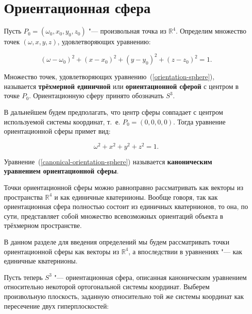 \section{Ориентационная сфера}

Пусть $P_0=(\omega_0,x_0,y_0,z_0)$ "--- произвольная точка из $\mathbb{R}^4$. Определим множество точек $(\omega,x,y,z)$,
удовлетворяющих уравнению:

\begin{equation}
(\omega-\omega_0)^2+(x-x_0)^2+(y-y_0)^2+(z-z_0)^2=1.
\label{orientation-sphere}
\end{equation}

\begin{definition}
Множество точек, удовлетворяющих уравнению~(\ref{orientation-sphere}), называется \textbf{трёхмерной единичной} или
\textbf{ориентационной сферой} с центром в точке $P_0$. Ориентационную сферу принято обозначать $S^3$.
\end{definition}

В дальнейшем будем предполагать, что центр сферы совпадает с центром используемой системы координат, т.~е. $P_0=(0,0,
0,0)$. Тогда уравнение ориентационной сферы примет вид:

\begin{equation}
\omega^2+x^2+y^2+z^2=1.
\label{canonical-orientation-sphere}
\end{equation}

\begin{definition}
Уравнение~(\ref{canonical-orientation-sphere}) называется \textbf{каноническим уравнением ориентационной сферы}.
\end{definition}

Точки ориентационной сферы можно равноправно рассматривать как векторы из пространства $\mathbb{R}^4$ и как единичные
кватернионы. Вообще говоря, так как ориентационная сфера полностью состоит из единичных кватернионов, то она, по
сути, представляет собой множество всевозможных ориентаций объекта в трёхмерном пространстве.

В данном разделе для введения определений мы будем рассматривать точки ориентационной сферы как векторы из
$\mathbb{R}^4$, а впоследствии в уравнениях "--- как единичные кватернионы.

Пусть теперь $S^3$ "--- ориентационная сфера, описанная каноническим уравнением относительно некоторой ортогональной
системы координат. Выберем произвольную плоскость, заданную относительно той же системы координат как пересечение
двух гиперплоскостей:


